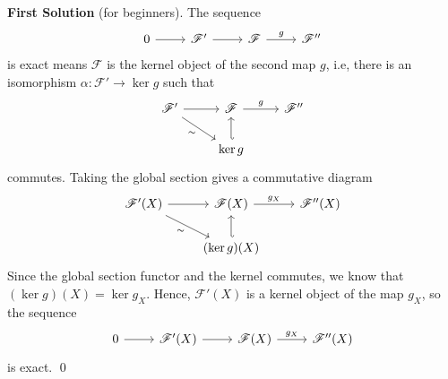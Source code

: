 \documentclass{article}
\theoremstyle{plain}
\theoremstyle{definition}
\begin{document}
\begin{tcolorbox}
    \textbf{First Solution} (for beginners). The sequence
    \[\begin{tikzcd}
        0 & {\mathscr{F}'} & {\mathscr{F}} & {\mathscr{F}''}
        \arrow[from=1-2, to=1-3]
        \arrow["g", from=1-3, to=1-4]
        \arrow[from=1-1, to=1-2]
    \end{tikzcd}\]
    is exact means $\mathscr{F}$ is the kernel object of the second map $g$, i.e, there is an isomorphism $\alpha: \mathscr{F}' \to \ker g$ such that
    \[\begin{tikzcd}
        {\mathscr{F}'} & {\mathscr{F}} & {\mathscr{F}''} \\
        & {\ker g}
        \arrow[from=1-1, to=1-2]
        \arrow["g", from=1-2, to=1-3]
        \arrow[hook', from=2-2, to=1-2]
        \arrow["\sim"', from=1-1, to=2-2]
    \end{tikzcd}\]
    commutes. Taking the global section gives a commutative diagram
    \[\begin{tikzcd}
        {\mathscr{F}'(X)} & {\mathscr{F}(X)} & {\mathscr{F}''(X)} \\
        & {(\ker g)(X)}
        \arrow[from=1-1, to=1-2]
        \arrow["{g_X}", from=1-2, to=1-3]
        \arrow[hook', from=2-2, to=1-2]
        \arrow["\sim"', from=1-1, to=2-2]
    \end{tikzcd}\]
    Since the global section functor and the kernel commutes, we know that $(\ker g)(X) = \ker g_X$. Hence, $\mathscr{F}'(X)$ is a kernel object of the map $g_X$, so the sequence
    \[\begin{tikzcd}
        0 & {\mathscr{F}'(X)} & {\mathscr{F}(X)} & {\mathscr{F}''(X)}
        \arrow[from=1-2, to=1-3]
        \arrow["{g_X}", from=1-3, to=1-4]
        \arrow[from=1-1, to=1-2]
    \end{tikzcd}\]
    is exact. \qed
\end{tcolorbox}
\end{document}
